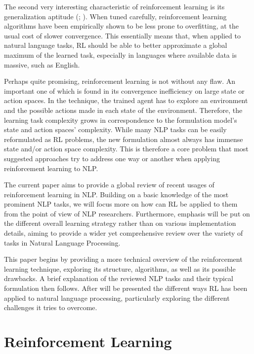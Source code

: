 \documentclass[twocolumn]{article}
\begin{document}
The second very interesting characteristic of reinforcement learning is its generalization aptitude (\cite{kaelbling1996reinforcement}; \cite{sutton-generalization-rl}). When tuned carefully, reinforcement learning algorithms have been empirically shown to be less prone to overfitting, at the usual cost of slower convergence. This essentially means that, when applied to natural language tasks, RL should be able to better approximate a global maximum of the learned task, especially in languages where available data is massive, such as English.

Perhaps quite promising, reinforcement learning is not without any flaw. An important one of which is found in its convergence inefficiency on large state or action spaces. In the technique, the trained agent has to explore an environment and the possible actions made in each state of the environment. Therefore, the learning task complexity grows in correspondence to the formulation model's state and action spaces' complexity. While many NLP tasks can be easily reformulated as RL problems, the new formulation almost always has immense state and/or action space complexity. This is therefore a core problem that most suggested approaches try to address one way or another when applying reinforcement learning to NLP.

The current paper aims to provide a global review of recent usages of reinforcement learning in NLP. Building on a basic knowledge of the most prominent NLP tasks, we will focus more on how can RL be applied to them from the point of view of NLP researchers. Furthermore, emphasis will be put on the different overall learning strategy rather than on various implementation details, aiming to provide a wider yet comprehensive review over the variety of tasks in Natural Language Processing.

This paper begins by providing a more technical overview of the reinforcement learning technique, exploring its structure, algorithms, as well as its possible drawbacks. A brief explanation of the reviewed NLP tasks and their typical formulation then follows. After will be presented the different ways RL has been applied to natural language processing, particularly exploring the different challenges it tries to overcome. 

\section{Reinforcement Learning}
\end{document}
